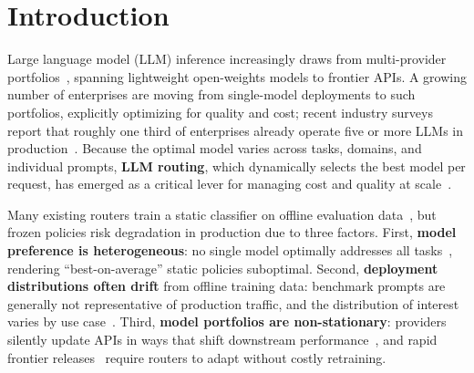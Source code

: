 
\section{Introduction}
\label{sec:intro}

Large language model (LLM) inference increasingly draws from multi-provider portfolios~\cite{chen2023frugalgpt}, spanning lightweight open-weights models to frontier APIs. A growing number of enterprises are moving from single-model deployments to such portfolios, explicitly optimizing for quality and cost; recent industry surveys report that roughly one third of enterprises already operate five or more LLMs in production~\cite{enterprise-multillm-2025}. Because the optimal model varies across tasks, domains, and individual prompts, \textbf{LLM routing}, which dynamically selects the best model per request, has emerged as a critical lever for managing cost and quality at scale~\cite{ong2024routellm, chen2024routerdc, feng2025graphrouter, panda2025pilot}.

Many existing routers train a static classifier on offline evaluation data~\cite{ong2024routellm, chen2024routerdc, feng2025graphrouter}, but frozen policies risk degradation in production due to three factors. First, \textbf{model preference is heterogeneous}: no single model optimally addresses all tasks~\cite{hu2024routerbench, ong2024routellm}, rendering ``best-on-average'' static policies suboptimal. Second, \textbf{deployment distributions often drift} from offline training data: benchmark prompts are generally not representative of production traffic, and the distribution of interest varies by use case~\cite{ailem2024benchmarkrobustness}. Third, \textbf{model portfolios are non-stationary}: providers silently update APIs in ways that shift downstream performance~\cite{chen2023chatgptdrift, ma2024prompt}, and rapid frontier releases~\cite{thompson2026timeline} require routers to adapt without costly retraining.

